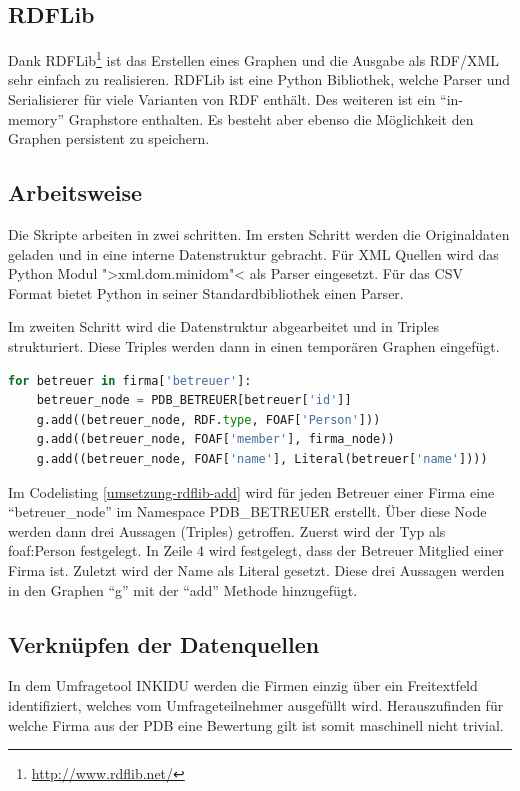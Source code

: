\subsection{RDFLib}
\label{subsec-rdflib}
Dank RDFLib\footnote{\url{http://www.rdflib.net/}} ist das Erstellen eines Graphen und die Ausgabe als RDF/XML sehr einfach zu realisieren.
RDFLib ist eine Python Bibliothek, welche Parser und Serialisierer für viele Varianten von RDF enthält.
Des weiteren ist ein ``in-memory'' Graphstore enthalten. Es besteht aber ebenso die Möglichkeit den Graphen persistent zu speichern.

\subsection{Arbeitsweise}
Die Skripte arbeiten in zwei schritten.
Im ersten Schritt werden die Originaldaten geladen und in eine interne Datenstruktur gebracht.
Für XML Quellen wird das Python Modul ">xml.dom.minidom"< als Parser eingesetzt.
Für das CSV Format bietet Python in seiner Standardbibliothek einen Parser.

Im zweiten Schritt wird die Datenstruktur abgearbeitet und in Triples strukturiert.
Diese Triples werden dann in einen temporären Graphen eingefügt.

\begin{lstlisting}[language=Python,caption=Alle Betreuer einer Firma werden zum Graphen ``g'' hinzugefügt,stepnumber=1,label=umsetzung-rdflib-add]
for betreuer in firma['betreuer']:
	betreuer_node = PDB_BETREUER[betreuer['id']]
	g.add((betreuer_node, RDF.type, FOAF['Person']))
	g.add((betreuer_node, FOAF['member'], firma_node))
	g.add((betreuer_node, FOAF['name'], Literal(betreuer['name'])))
\end{lstlisting}

Im Codelisting \ref{umsetzung-rdflib-add} wird für jeden Betreuer einer Firma eine ``betreuer\_node'' im Namespace PDB\_BETREUER erstellt.
Über diese Node werden dann drei Aussagen (Triples) getroffen. Zuerst wird der Typ als foaf:Person festgelegt.
In Zeile 4 wird festgelegt, dass der Betreuer Mitglied einer Firma ist. Zuletzt wird der Name als Literal gesetzt.
Diese drei Aussagen werden in den Graphen ``g'' mit der ``add'' Methode hinzugefügt.

\subsection{Verknüpfen der Datenquellen}

In dem Umfragetool INKIDU werden die Firmen einzig über ein Freitextfeld identifiziert, welches vom Umfrageteilnehmer ausgefüllt wird.
Herauszufinden für welche Firma aus der PDB eine Bewertung gilt ist somit maschinell nicht trivial.

